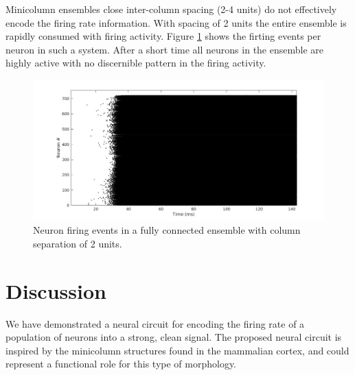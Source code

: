 \documentclass[a4paper,11pt]{article}
\begin{document}
Minicolumn ensembles close inter-column spacing (2-4 units) do not effectively encode the firing rate information.
With spacing of 2 units the entire ensemble is rapidly consumed with firing activity.
Figure \ref{fig:onebigcolumn} shows the firting events per neuron in such a system.
After a short time all neurons in the ensemble are highly active with no discernible pattern in the firing activity.
\begin{figure}[!ht]
 \caption{Neuron firing events in a fully connected ensemble with column separation of 2 units.} 
 \label{fig:onebigcolumn}
 \centering
   \includegraphics[width=\textwidth]{fig/OneBigColumn}
\end{figure}


\clearpage
\section{Discussion}
We have demonstrated a neural circuit for encoding the firing rate of a population of neurons into a strong, clean signal.
The proposed neural circuit is inspired by the minicolumn structures found in the mammalian cortex, and could represent a functional role for this type of morphology.


\clearpage
\printbibliography
\end{document}
